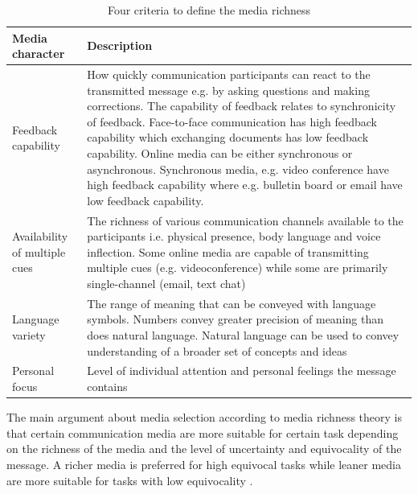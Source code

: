 \documentclass[english,12pt,a4paper,pdftex]{article}
\begin{document}
\begin{table}[!h]
\renewcommand{\arraystretch}{1.3}
\caption{Four criteria to define the media richness \citep{graveline2000} \citep{daft1987}}
\label{table:criteria_media_richness}
\centering
\begin{tabular}{|p{4cm}|p{10cm}|}
\hline
\textbf{Media character} & \textbf{Description}\\
\hline
Feedback capability & How quickly communication participants can react to the transmitted message e.g. by asking questions and making corrections. The capability of feedback relates to synchronicity of feedback. Face-to-face communication has high feedback capability which exchanging documents has low feedback capability. Online media can be either synchronous or asynchronous. Synchronous media, e.g. video conference have high feedback capability where e.g. bulletin board or email have low feedback capability. \\
\hline
Availability of multiple cues & The richness of various communication channels available to the participants i.e. physical presence, body language and voice inflection. Some online media are capable of transmitting multiple cues (e.g. videoconference) while some are primarily single-channel (email, text chat) \\
\hline
Language variety & The range of meaning that can be conveyed with language symbols. Numbers convey greater precision of meaning than does natural language. Natural language can be used to convey understanding of a broader set of concepts and ideas \\
\hline
Personal focus & Level of individual attention and personal feelings the message contains \\
\hline
\end{tabular}
\end{table}

The main argument about media selection according to media richness theory is that certain communication media are more suitable for certain task depending on the richness of the media and the level of uncertainty and equivocality of the message. A richer media is preferred for high equivocal tasks while leaner media are more suitable for tasks with low equivocality \citep{daft1987}.
\end{document}
